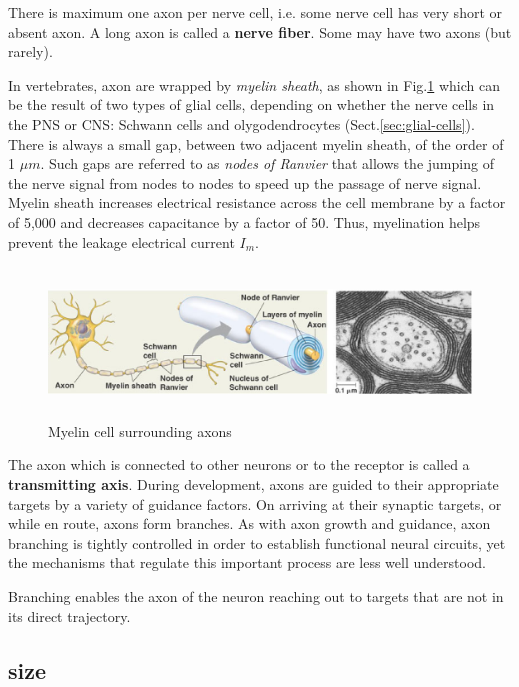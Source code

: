 There is maximum one axon per nerve cell, i.e. some nerve cell has very short or
absent axon. A long axon is called a {\bf nerve fiber}. Some may have two axons
(but rarely).

In vertebrates, axon are wrapped by {\it myelin sheath}, as shown in
Fig.\ref{fig:myelin_cell} which can be the result of two types of glial cells,
depending on whether the nerve cells in the PNS or CNS: Schwann cells and
olygodendrocytes (Sect.\ref{sec:glial-cells}). 
There is always a small gap, between two adjacent myelin sheath, of the order of
1 $\mu m$. Such gaps are referred to as {\it nodes of Ranvier} that allows the
jumping of the nerve signal from nodes to nodes to speed up the passage of nerve
signal. Myelin sheath increases electrical resistance across the cell membrane
by a factor of 5,000 and decreases capacitance by a factor of 50. Thus,
myelination helps prevent the leakage electrical current $I_m$.


\begin{figure}[htb]
  \centerline{\includegraphics[height=4cm]{./images/myelin_sheath.eps}}
\caption{Myelin cell surrounding axons}\label{fig:myelin_cell}
\end{figure} 

The axon which is connected to other neurons or to the receptor is called a
{\bf transmitting axis}. 
During development, axons are guided to their appropriate targets by a variety
of guidance factors. On arriving at their synaptic targets, or while en route, axons form branches.
As with axon growth and guidance, axon branching is tightly controlled in order
to establish functional neural circuits, yet the mechanisms that
regulate this important process are less well understood.

Branching enables the axon of the neuron reaching out to targets that are not in
its direct trajectory.

\subsection{size}
\label{sec:axon-dimension}

